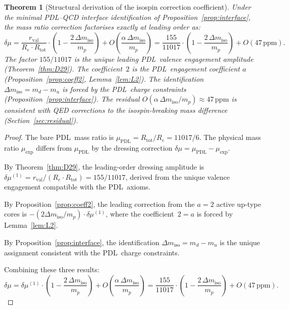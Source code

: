 \documentclass[11pt,a4paper]{article}
\newtheorem{theorem}{Theorem}[section]
\theoremstyle{definition}
\newcommand{\PDL}{\textnormal{PDL}}
\newcommand{\Rtot}{R_{\mathrm{tot}}}
\newcommand{\rval}{r_{\mathrm{val}}}
\newcommand{\muPDL}{\mu_{\mathrm{PDL}}}
\newcommand{\muexp}{\mu_{\mathrm{exp}}}
\newcommand{\dmu}{\delta\mu}
\newcommand{\dmuLO}{\dmu^{(1)}}
\newcommand{\dmiso}{\Delta m_{\mathrm{iso}}}
\newcommand{\Ree}{R_e}
\begin{document}
\begin{theorem}[Structural derivation of the isospin correction coefficient]
\label{thm:main}
Under the minimal \PDL--QCD interface identification of Proposition~\ref{prop:interface}, the mass ratio correction factorises exactly at leading order as:
\begin{equation}
\dmu = \frac{\rval}{\Ree\cdot\Rtot}\cdot\left(1 - \frac{2\,\dmiso}{m_p}\right) + O\!\left(\frac{\alpha\,\dmiso}{m_p}\right) = \frac{155}{11017}\cdot\left(1-\frac{2\,\dmiso}{m_p}\right) + O(47\,\mathrm{ppm}).
\label{eq:main_thm}
\end{equation}
The factor $155/11017$ is the unique leading \PDL\ valence engagement amplitude (Theorem~\ref{thm:D29}). The coefficient~$2$ is the \PDL\ engagement coefficient $a$ (Proposition~\ref{prop:coeff2}, Lemma~\ref{lem:L2}). The identification $\dmiso = m_d - m_u$ is forced by the \PDL\ charge constraints (Proposition~\ref{prop:interface}). The residual $O(\alpha\,\dmiso/m_p) \approx 47\,\mathrm{ppm}$ is consistent with QED corrections to the isospin-breaking mass difference (Section~\ref{sec:residual}).
\end{theorem}

\begin{proof}
The bare \PDL\ mass ratio is $\muPDL = \Rtot/\Ree = 11017/6$. The physical mass ratio $\muexp$ differs from $\muPDL$ by the dressing correction $\dmu = \muPDL - \muexp$.

By Theorem~\ref{thm:D29}, the leading-order dressing amplitude is $\dmuLO = \rval/(\Ree\cdot\Rtot) = 155/11017$, derived from the unique valence engagement compatible with the \PDL\ axioms.

By Proposition~\ref{prop:coeff2}, the leading correction from the $a = 2$ active up-type cores is $-(2\dmiso/m_p)\cdot\dmuLO$, where the coefficient~$2 = a$ is forced by Lemma~\ref{lem:L2}.

By Proposition~\ref{prop:interface}, the identification $\dmiso = m_d - m_u$ is the unique assignment consistent with the \PDL\ charge constraints.

Combining these three results:
\begin{equation}
\dmu = \dmuLO\cdot\left(1 - \frac{2\,\dmiso}{m_p}\right) + O\!\left(\frac{\alpha\,\dmiso}{m_p}\right) = \frac{155}{11017}\cdot\left(1-\frac{2\,\dmiso}{m_p}\right) + O(47\,\mathrm{ppm}).
\end{equation}
\end{proof}
\end{document}
